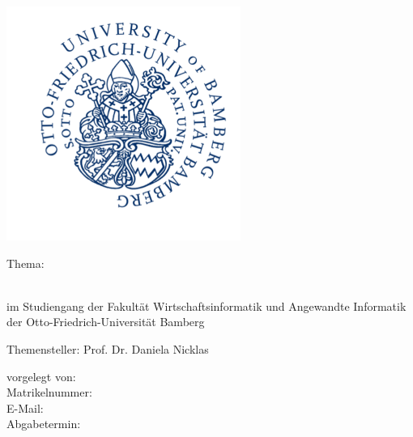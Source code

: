 
\pagestyle{empty}
\clearscrheadings\clearscrplain

\begin{titlepage}
\begin{center}

\includegraphics[scale=1.0]{grafiken/logo}

\begin{minipage}{12cm}
\centering
Thema:\\
\Large
\thetitle
\end{minipage}
\vspace{2cm}

\begin{minipage}{12cm}
\centering
\Large
\arbeitstyp \\ \vspace{1cm}
\normalsize
im Studiengang \studiengang der Fakult\"at Wirtschaftsinformatik und Angewandte Informatik der Otto-Friedrich-Universit\"at Bamberg
\end{minipage}
\end{center}
\vspace{1,5cm}

\begin{normalsize}
Themensteller: Prof. Dr. Daniela Nicklas
\vspace{0,5cm}

vorgelegt von: \theauthor \\
Matrikelnummer: \matrikel \\
E-Mail: \href{mailto:\email}{\email}\\
Abgabetermin: \termin
\end{normalsize}

\end{titlepage}

\clearpage
